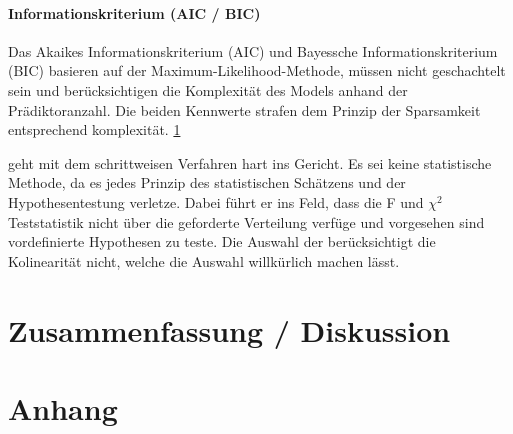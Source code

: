 \documentclass[english,12pt,doc]{apa}
\begin{document}
\paragraph{Informationskriterium (AIC / BIC)} Das Akaikes Informationskriterium (AIC) und Bayessche Informationskriterium (BIC) basieren auf der Maximum-Likelihood-Methode, müssen nicht geschachtelt sein und berücksichtigen die Komplexität des Models anhand der Prädiktoranzahl. Die beiden Kennwerte strafen dem Prinzip der Sparsamkeit entsprechend komplexität. \ref{xx}


 geht mit dem schrittweisen Verfahren hart ins Gericht. Es sei keine statistische Methode, da es  jedes Prinzip des statistischen Schätzens und der Hypothesentestung verletze. Dabei führt er ins Feld, dass die F und $\chi^2$ Teststatistik nicht über die geforderte Verteilung verfüge und vorgesehen sind vordefinierte Hypothesen zu teste. Die Auswahl der berücksichtigt die Kolinearität nicht, welche die Auswahl willkürlich machen lässt.

\section{Zusammenfassung / Diskussion}
\label{xx}
\blindtext

\newpage
 

\newpage
\section{Anhang}
\blindtext
\newpage
\end{document}

